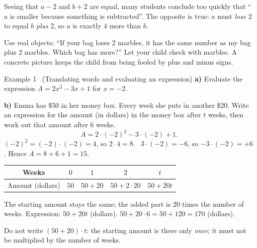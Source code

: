 \begin{warnbox}
Seeing that $a-2$ and $b+2$ are equal, many students conclude too quickly that ``$a$ is smaller because something is subtracted''. The opposite is true:
$a$ must \emph{lose} $2$ to equal $b$ \emph{plus} $2$, so $a$ is exactly $4$ more than $b$.
\end{warnbox}

\begin{parentbox}
Use real objects: ``If your bag loses $2$ marbles, it has the same number as my bag plus $2$ marbles. Which bag has more?''
Let your child check with marbles. A concrete picture keeps the child from being fooled by plus and minus signs.
\end{parentbox}


\begin{exbox}{Example 1 \ (Translating words and evaluating an expression)}
\textbf{a)} Evaluate the expression $A=2x^2-3x+1$ for $x=-2$.

\textbf{b)} Emma has $\$50$ in her money box. Every week she puts in another $\$20$.
Write an expression for the amount (in dollars) in the money box after $t$ weeks, then work out that amount after $6$ weeks.
\guide
{}
\[A=2\cdot(-2)^2-3\cdot(-2)+1.\]
$(-2)^2=(-2)\cdot(-2)=4$, so $2\cdot 4=8$. \ $3\cdot(-2)=-6$, so $-3\cdot(-2)=+6$. Hence $A=8+6+1=15$.
\begin{center}
\begin{tabular}{|c|c|c|c|c|}
\hline
\rowcolor{tmBlue!10} Weeks & $0$ & $1$ & $2$ & $t$\\ \hline
Amount (dollars) & $50$ & $50+20$ & $50+2\cdot 20$ & $50+20t$\\ \hline
\end{tabular}
\end{center}
The starting amount stays the same; the added part is $20$ times the number of weeks. Expression: $50+20t$ (dollars).
$50+20\cdot 6=50+120=170$ (dollars).
\begin{warnbox}Do not write $(50+20)\cdot t$: the starting amount is there only \emph{once}; it must not be multiplied by the number of weeks.\end{warnbox}
\end{exbox}

